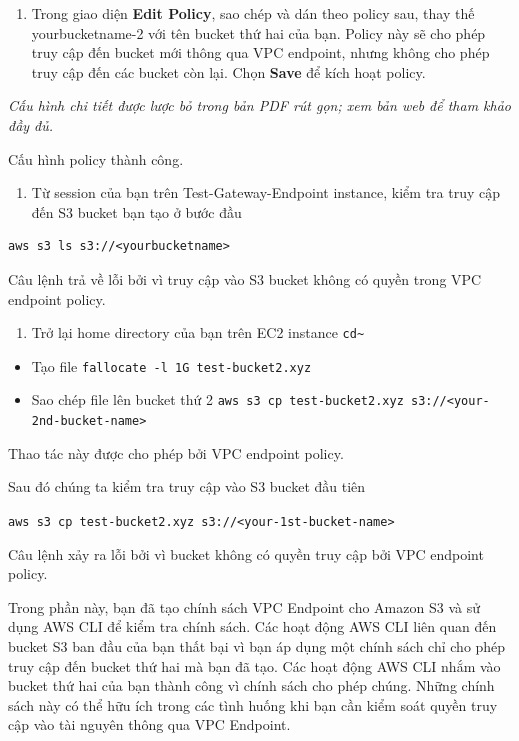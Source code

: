 \begin{enumerate}
\def\labelenumi{\arabic{enumi}.}
\setcounter{enumi}{3}
\tightlist
\item
  Trong giao diện \textbf{Edit Policy}, sao chép và dán theo policy sau,
  thay thế yourbucketname-2 với tên bucket thứ hai của bạn. Policy này
  sẽ cho phép truy cập đến bucket mới thông qua VPC endpoint, nhưng
  không cho phép truy cập đến các bucket còn lại. Chọn \textbf{Save} để
  kích hoạt policy.
\end{enumerate}

\emph{Cấu hình chi tiết được lược bỏ trong bản PDF rút gọn; xem bản web
để tham khảo đầy đủ.}

Cấu hình policy thành công.

\begin{enumerate}
\def\labelenumi{\arabic{enumi}.}
\setcounter{enumi}{4}
\tightlist
\item
  Từ session của bạn trên Test-Gateway-Endpoint instance, kiểm tra truy
  cập đến S3 bucket bạn tạo ở bước đầu
\end{enumerate}

\begin{verbatim}
aws s3 ls s3://<yourbucketname>
\end{verbatim}

Câu lệnh trả về lỗi bởi vì truy cập vào S3 bucket không có quyền trong
VPC endpoint policy.

\begin{enumerate}
\def\labelenumi{\arabic{enumi}.}
\setcounter{enumi}{5}
\tightlist
\item
  Trở lại home directory của bạn trên EC2 instance
  \texttt{cd\textasciitilde{}}
\end{enumerate}

\begin{itemize}
\tightlist
\item
  Tạo file \texttt{fallocate\ -l\ 1G\ test-\allowbreak{}bucket2.\allowbreak{}xyz}
\item
  Sao chép file lên bucket thứ 2
  \texttt{aws\ s3\ cp\ test-bucket2.xyz\ s3://\textless{}your-2nd-bucket-name\textgreater{}}
\end{itemize}

Thao tác này được cho phép bởi VPC endpoint policy.

Sau đó chúng ta kiểm tra truy cập vào S3 bucket đầu tiên

\texttt{aws\ s3\ cp\ test-bucket2.xyz\ s3://\textless{}your-1st-bucket-name\textgreater{}}

Câu lệnh xảy ra lỗi bởi vì bucket không có quyền truy cập bởi VPC
endpoint policy.

Trong phần này, bạn đã tạo chính sách VPC Endpoint cho Amazon S3 và sử
dụng AWS CLI để kiểm tra chính sách. Các hoạt động AWS CLI liên quan đến
bucket S3 ban đầu của bạn thất bại vì bạn áp dụng một chính sách chỉ cho
phép truy cập đến bucket thứ hai mà bạn đã tạo. Các hoạt động AWS CLI
nhắm vào bucket thứ hai của bạn thành công vì chính sách cho phép chúng.
Những chính sách này có thể hữu ích trong các tình huống khi bạn cần
kiểm soát quyền truy cập vào tài nguyên thông qua VPC Endpoint.
